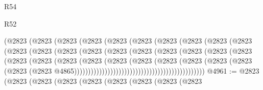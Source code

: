 \begin{lexlean}{R54}
\begin{lexlean}{R52}
\begin{coremodule}
{{{{{{{{{{{{{{{{{{{{{{{{{{{{{{{{{{{{{{{{{{{{{{{{{{{{{{{{{{{{{{{{{{{{{{{{{{{{{{{{{{{{{{{{{{{{{{{{{{{{{{{{{{{{{{{{{{{{{{{{{{{{{{{{{{{{{{{{{{{{{{{{{{{{{{{{{{{{{{{{{{{{{{{{{{{{{{{{{{{{{{{{{{{{{{{{{{{{{{                                  (@2823
                                    (@2823
                                      (@2823
                                        (@2823
                                          (@2823
                                            (@2823
                                              (@2823
                                                (@2823
                                                  (@2823
                                                    (@2823
                                                      (@2823
                                                        (@2823
                                                          (@2823
                                                            (@2823
                                                              (@2823
                                                                (@2823
                                                                  (@2823
                                                                    (@2823
                                                                      (@2823
                                                                        (@2823
                                                                          (@2823
                                                                            (@2823
                                                                              (@2823
                                                                                (@2823
                                                                                  (@2823
                                                                                    (@2823
                                                                                      (@2823
                                                                                        (@2823
                                                                                          (@2823
                                                                                            (@2823
                                                                                              (@2823
                                                                                                (@2823
                                                                                                  @4865)))))))))))))))))))))))))))))))))))))))))))))))
@4961 := @2823
    (@2823
      (@2823
        (@2823
          (@2823
            (@2823
              (@2823
                (@2823
                  (@2823
}}}}}}}}}}}}}}}}}}}}}}}}}}}}}}}}}}}}}}}}}}}}}}}}}}}}}}}}}}}}}}}}}}}}}}}}}}}}}}}}}}}}}}}}}}}}}}}}}}}}}}}}}}}}}}}}}}}}}}}}}}}}}}}}}}}}}}}}}}}}}}}}}}}}}}}}}}}}}}}}}}}}}}}}}}}}}}}}}}}}}}}}}}}}}}}}}}}}}}
\end{coremodule}
\end{lexlean}
\end{lexlean}
